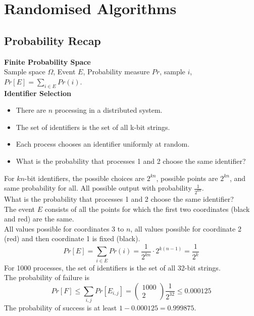 \documentclass[onecolumn]{report}
\begin{document}
\chapter{Randomised Algorithms}
\section{Probability Recap}
\textbf{Finite Probability Space}\\
Sample space $\Omega$, Event $E$, Probability measure $Pr$, sample $i$, $Pr[E]=\sum_{i \in E} Pr(i)$.\\
\textbf{Identifier Selection}\\
\begin{itemize}
    \item There are $n$ processing in a distributed system.
    \item The set of identifiers is the set of all k-bit strings.
    \item Each process chooses an identifier uniformly at random.
    \item What is the probability that processes 1 and 2 choose the same identifier?
\end{itemize}
For $kn$-bit identifiers, the possible choices are $2^{kn}$, possible points are $2^{kn}$, and same probability for all. All possible output with probability $\frac{1}{2^{kn}}$.\\
What is the probability that processes 1 and 2 choose the same identifier?\\
The event $E$ consists of all the points for which the first two coordinates (black and red) are the same.\\
All values possible for coordinates 3 to $n$, all values possible for coordinate 2 (red) and then coordinate 1 is fixed (black).\\
\begin{equation*}
    Pr[E]=\sum_{i \in E} Pr(i)=\frac{1}{2^{kn}} \cdot 2^{k(n-1)}=\frac{1}{2^k}
\end{equation*}
For 1000 processes, the set of identifiers is the set of all 32-bit strings.\\
The probability of failure is 
\begin{equation*}
    Pr[F] \leq \sum_{i,j} Pr[E_{i,j}]=\begin{pmatrix} 1000 \\ 2 \end{pmatrix} \frac{1}{2^{32}} \leq 0.000125
\end{equation*}
The probability of success is at least $1-0.000125=0.999875$.\\
\end{document}
